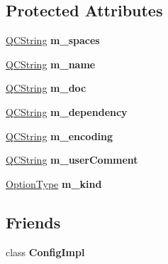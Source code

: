 \subsection*{Protected Attributes}
\begin{DoxyCompactItemize}
\item 
\mbox{\label{class_config_option_aa3ef6fe13a480dad1404aee1bb0f2d11}} 
\mbox{\hyperlink{class_q_c_string}{Q\+C\+String}} {\bfseries m\+\_\+spaces}
\item 
\mbox{\label{class_config_option_a4f081d447f2443212d0d032da63b20d7}} 
\mbox{\hyperlink{class_q_c_string}{Q\+C\+String}} {\bfseries m\+\_\+name}
\item 
\mbox{\label{class_config_option_a28fdea8e9fdf86e73faae697454c17ab}} 
\mbox{\hyperlink{class_q_c_string}{Q\+C\+String}} {\bfseries m\+\_\+doc}
\item 
\mbox{\label{class_config_option_a5146ef81dc662e3c5b2f1e9d1f3c600e}} 
\mbox{\hyperlink{class_q_c_string}{Q\+C\+String}} {\bfseries m\+\_\+dependency}
\item 
\mbox{\label{class_config_option_a4953007ad225b5996adf18275f59e922}} 
\mbox{\hyperlink{class_q_c_string}{Q\+C\+String}} {\bfseries m\+\_\+encoding}
\item 
\mbox{\label{class_config_option_a5e54ead18c124c6c6c03ed3b678a7103}} 
\mbox{\hyperlink{class_q_c_string}{Q\+C\+String}} {\bfseries m\+\_\+user\+Comment}
\item 
\mbox{\label{class_config_option_a64896a35334d6ab865f8038fb65024ac}} 
\mbox{\hyperlink{class_config_option_ad60cb308cdf307e72796dc2fc2a40fda}{Option\+Type}} {\bfseries m\+\_\+kind}
\end{DoxyCompactItemize}
\subsection*{Friends}
\begin{DoxyCompactItemize}
\item 
\mbox{\label{class_config_option_a899985dcdc768533e4fc014af00f9299}} 
class {\bfseries Config\+Impl}
\end{DoxyCompactItemize}


